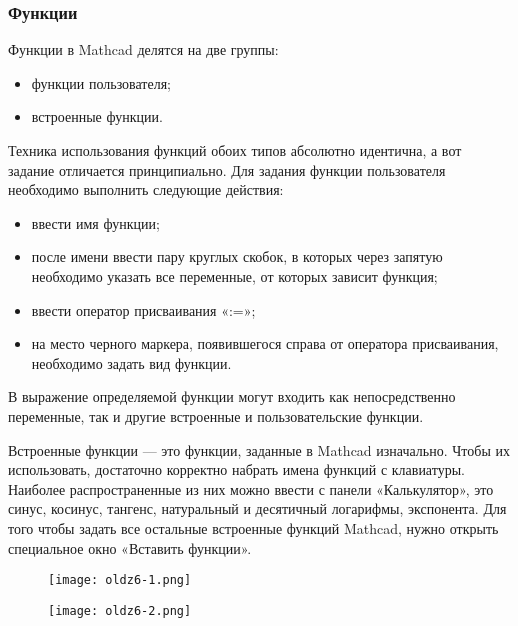 \subsubsection{Функции}
Функции в Mathcad делятся на две группы:
\begin{itemize}
\item функции пользователя;
\item встроенные функции.
\end{itemize}
Техника использования функций обоих типов абсолютно идентична, а вот задание отличается принципиально. Для задания функции пользователя необходимо выполнить следующие действия:
\begin{itemize}
\item ввести имя функции;
\item после имени ввести пару круглых скобок, в которых через запятую необходимо указать все переменные, от которых зависит функция;
\item ввести оператор присваивания «:=»;
\item на место черного маркера, появившегося справа от оператора присваивания, необходимо задать вид функции.
\end{itemize}

В выражение определяемой функции могут входить как непосредственно переменные, так и другие встроенные и пользовательские функции. 

Встроенные функции --- это функции, заданные в Mathcad изначально. Чтобы их использовать, достаточно корректно набрать имена функций с клавиатуры. Наиболее распространенные из них можно ввести с панели «Калькулятор», это синус, косинус, тангенс, натуральный и десятичный логарифмы, экспонента. Для того чтобы задать все остальные встроенные функций Mathcad, нужно открыть специальное окно «Вставить функции».

\begin{figure}[h]
	\begin{center}
		\texttt{[image: oldz6-1.png]}
	\end{center}
\end{figure}

\begin{figure}[h]
	\begin{center}
		\texttt{[image: oldz6-2.png]}
	\end{center}
\end{figure}

